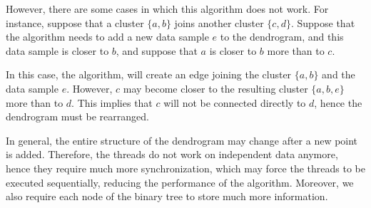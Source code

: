 \documentclass{article}
\begin{document}
However, there are some cases in which this algorithm does not work.
For instance, suppose that a cluster $\{a, b\}$ joins another cluster $\{c, d\}$.
Suppose that the algorithm needs to add a new data sample $e$ to the dendrogram, and this data sample
is closer to $b$, and suppose that $a$ is closer to $b$ more than to $c$.

In this case, the algorithm, will create an edge joining the cluster $\{a, b\}$ and the data sample
$e$. However, $c$ may become closer to the resulting cluster $\{a, b, e\}$ more than to $d$. This
implies that $c$ will not be connected directly to $d$, hence the dendrogram must be rearranged.

In general, the entire structure of the dendrogram may change after a new point is added.
Therefore, the threads do not work on independent data anymore, hence they require much more synchronization, which may force the threads to be executed sequentially, reducing the performance of the algorithm.
Moreover, we also require each node of the binary tree to store much more information.
%
%
%
\end{document}
